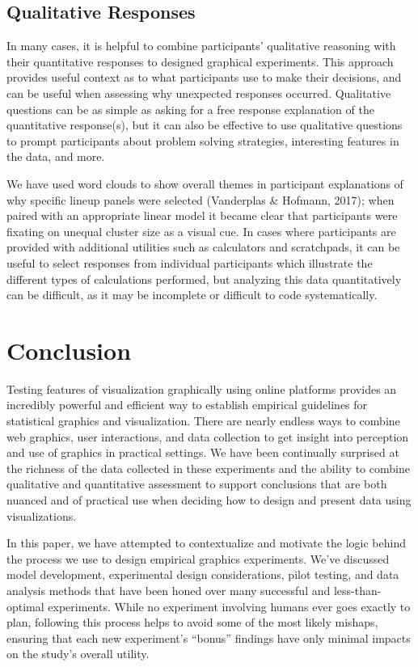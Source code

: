\documentclass[
  10pt,
]{article}
\begin{document}
\subsection{Qualitative Responses}\label{qualitative-responses}

In many cases, it is helpful to combine participants' qualitative
reasoning with their quantitative responses to designed graphical
experiments. This approach provides useful context as to what
participants use to make their decisions, and can be useful when
assessing why unexpected responses occurred. Qualitative questions can
be as simple as asking for a free response explanation of the
quantitative response(s), but it can also be effective to use
qualitative questions to prompt participants about problem solving
strategies, interesting features in the data, and more.

We have used word clouds to show overall themes in participant
explanations of why specific lineup panels were selected (Vanderplas \&
Hofmann, 2017); when paired with an appropriate linear model it became
clear that participants were fixating on unequal cluster size as a
visual cue. In cases where participants are provided with additional
utilities such as calculators and scratchpads, it can be useful to
select responses from individual participants which illustrate the
different types of calculations performed, but analyzing this data
quantitatively can be difficult, as it may be incomplete or difficult to
code systematically.

\section{Conclusion}\label{conclusion}

Testing features of visualization graphically using online platforms
provides an incredibly powerful and efficient way to establish empirical
guidelines for statistical graphics and visualization. There are nearly
endless ways to combine web graphics, user interactions, and data
collection to get insight into perception and use of graphics in
practical settings. We have been continually surprised at the richness
of the data collected in these experiments and the ability to combine
qualitative and quantitative assessment to support conclusions that are
both nuanced and of practical use when deciding how to design and
present data using visualizations.

In this paper, we have attempted to contextualize and motivate the logic
behind the process we use to design empirical graphics experiments.
We've discussed model development, experimental design considerations,
pilot testing, and data analysis methods that have been honed over many
successful and less-than-optimal experiments. While no experiment
involving humans ever goes exactly to plan, following this process helps
to avoid some of the most likely mishaps, ensuring that each new
experiment's ``bonus'' findings have only minimal impacts on the study's
overall utility.
\end{document}
